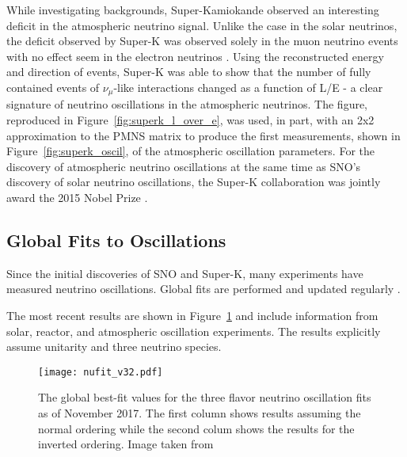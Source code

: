 While investigating backgrounds, Super-Kamiokande observed an interesting deficit in the atmospheric neutrino signal.
Unlike the case in the solar neutrinos, the deficit observed by Super-K was observed solely in the muon neutrino events with no effect seem in the electron neutrinos \cite{SuperK-Oscillations}.
Using the reconstructed energy and direction of events, Super-K was able to show that the number of fully contained events of $\nu_\mu$-like interactions changed as a function of L/E - a clear signature of neutrino oscillations in the atmospheric neutrinos.
The figure, reproduced in Figure~\ref{fig:superk_l_over_e}, was used, in part, with an 2x2 approximation to the PMNS matrix to produce the first measurements, shown in Figure~\ref{fig:superk_oscil}, of the atmospheric oscillation parameters.
For the discovery of atmospheric neutrino oscillations at the same time as SNO's discovery of solar neutrino oscillations, the Super-K collaboration was jointly award the 2015 Nobel Prize \cite{NobelPrize:2015-Oscillations}.



\label{subsec:global_fits}
\subsection{Global Fits to Oscillations}
Since the initial discoveries of SNO and Super-K, many experiments have measured neutrino oscillations. 
Global fits are performed and updated regularly \cite{NuFit_2.2, NuFit.org}.

The most recent results are shown in Figure~\ref{fig:nufit_v32} and include information from solar, reactor, and atmospheric oscillation experiments.
The results explicitly assume unitarity and three neutrino species.

\begin{figure}[!h]
\texttt{[image: nufit\_v32.pdf]}
\caption{The global best-fit values for the three flavor neutrino oscillation fits as of November 2017. The first column shows results assuming the normal ordering while the second colum shows the results for the inverted ordering. Image taken from \cite{NuFit.org}}
\label{fig:nufit_v32}
\end{figure}

